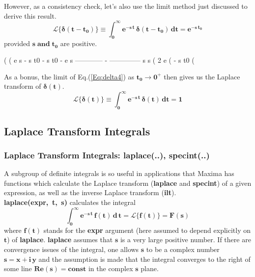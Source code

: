 \documentclass[12pt]{article}
\begin{document}
\noindent However, as a consistency check, let's also use the limit method just
  discussed to derive this result.
\begin{equation} \label{Eq:delta4}
\mathbf{ \mathcal{L} \{\boldsymbol{\delta}(t - t_{0})\} \equiv
       \int_{0}^{\infty}  e^{-s\,t}\, \boldsymbol{\delta}(t - t_{0})\,dt =
	   e^{-s\,t_{0}} }
\end{equation}
provided $\mathbf{s \; \text{and} \; t_{0}  }$ are positive.
\begin{myVerbatim}
(%
(%
                           e s - s t0     - s t0 - e s
                         ------------ - --------------
                              s               s
(%
                                      2 e
(%
                                     - s t0
(%
\end{myVerbatim}
As a bonus, the limit of Eq.(\ref{Eq:delta4}) as $\mathbf{t_{0} \rightarrow 0^{+} }$ then
  gives us the Laplace transform of $\mathbf{\boldsymbol{\delta}(t)}$.
\begin{equation}
\mathbf{\mathcal{L} \{\boldsymbol{\delta}(t)\} \equiv 
        \int_{0}^{\infty} e^{-s\,t}\,\boldsymbol{\delta}(t)\,dt = 1 }
\end{equation}
\newpage
\subsection{Laplace Transform Integrals}
\subsubsection{Laplace Transform Integrals: \textbf{laplace(..)}, \textbf{specint(..)}}
A subgroup of definite integrals is so useful in applications that Maxima
  has functions which calculate the Laplace transform (\textbf{laplace}
  and \textbf{specint}) of a given  expression, as well as the inverse Laplace
  transform (\textbf{ilt}).\\
  
\noindent \textbf{laplace(expr,\, t,\, s)} calculates the integral
\begin{equation}
\mathbf{\int_{0}^{\infty} e^{- s\,t} \, f(t)\, d\,t = \mathcal{L} \{f(t)\} = F(s) }
\end{equation}
where $\mathbf{f(t)}$ stands for the \textbf{expr} argument (here assumed to depend
  explicitly on $\mathbf{t}$) of \textbf{laplace}.
\textbf{laplace} assumes that $\mathbf{s}$ is a very large positive number.
If there are convergence issues of the integral, one allows $\mathbf{s}$ to
  be a complex number $\mathbf{s = x + i\,y}$ and the assumption is made that
  the integral converges to the right of some line $\mathbf{Re(s) = const}$ in the
  complex $\mathbf{s}$ plane.\\
\end{document}
